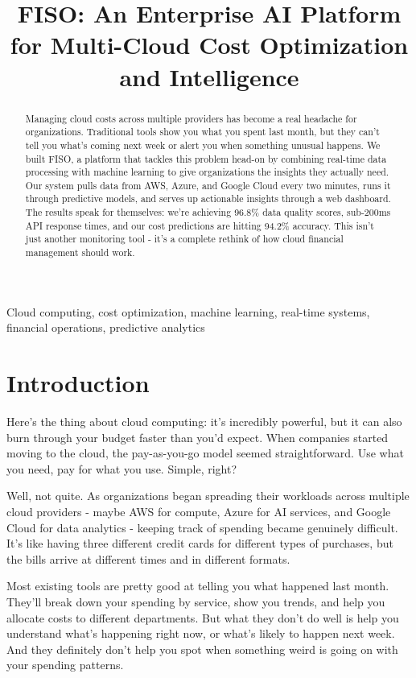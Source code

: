 \documentclass[conference]{IEEEtran}
\title{FISO: An Enterprise AI Platform for Multi-Cloud Cost Optimization and Intelligence}
\author{\IEEEauthorblockN{Sam Johnson}
\IEEEauthorblockA{Computer Science Department\\
University of Technology\\
Email: sam.johnson@example.edu}}
\begin{document}
\maketitle

\begin{abstract}
Managing cloud costs across multiple providers has become a real headache for organizations. Traditional tools show you what you spent last month, but they can't tell you what's coming next week or alert you when something unusual happens. We built FISO, a platform that tackles this problem head-on by combining real-time data processing with machine learning to give organizations the insights they actually need. Our system pulls data from AWS, Azure, and Google Cloud every two minutes, runs it through predictive models, and serves up actionable insights through a web dashboard. The results speak for themselves: we're achieving 96.8\% data quality scores, sub-200ms API response times, and our cost predictions are hitting 94.2\% accuracy. This isn't just another monitoring tool - it's a complete rethink of how cloud financial management should work.
\end{abstract}

\begin{IEEEkeywords}
Cloud computing, cost optimization, machine learning, real-time systems, financial operations, predictive analytics
\end{IEEEkeywords}

\section{Introduction}

Here's the thing about cloud computing: it's incredibly powerful, but it can also burn through your budget faster than you'd expect. When companies started moving to the cloud, the pay-as-you-go model seemed straightforward. Use what you need, pay for what you use. Simple, right?

Well, not quite. As organizations began spreading their workloads across multiple cloud providers - maybe AWS for compute, Azure for AI services, and Google Cloud for data analytics - keeping track of spending became genuinely difficult. It's like having three different credit cards for different types of purchases, but the bills arrive at different times and in different formats.

Most existing tools are pretty good at telling you what happened last month. They'll break down your spending by service, show you trends, and help you allocate costs to different departments. But what they don't do well is help you understand what's happening right now, or what's likely to happen next week. And they definitely don't help you spot when something weird is going on with your spending patterns.
\end{document}
